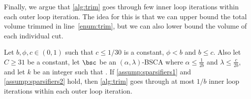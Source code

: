 \noindent
Finally, we argue that \cref{alg:trim} goes through few inner loop iterations within each outer loop iteration. The idea for this is that we can upper bound the total volume trimmed in line~\eqref{enum:trim}, but we can also lower bound the volume of each individual cut.

\begin{lemma}
	\label{lem:boundinnerloop}
	Let $b, \phi,c \in (0,1)$ such that $c \leq 1/30$ is a constant, $\phi < b$ and $b \le c$. Also let $C \ge 31$ be a constant, let $\bsc$ be an $(\alpha,\lambda)$-BSCA where $\alpha \le \frac{1}{2b}$ and $\lambda \le \frac{c}{2b}$, and let $k$ be an integer such that . If \cref{assump:sparsifiers1} and \cref{assump:sparsifiers2} hold, then \cref{alg:trim} goes through at most $1/{b}$ inner loop iterations within each outer loop iteration.
\end{lemma}
